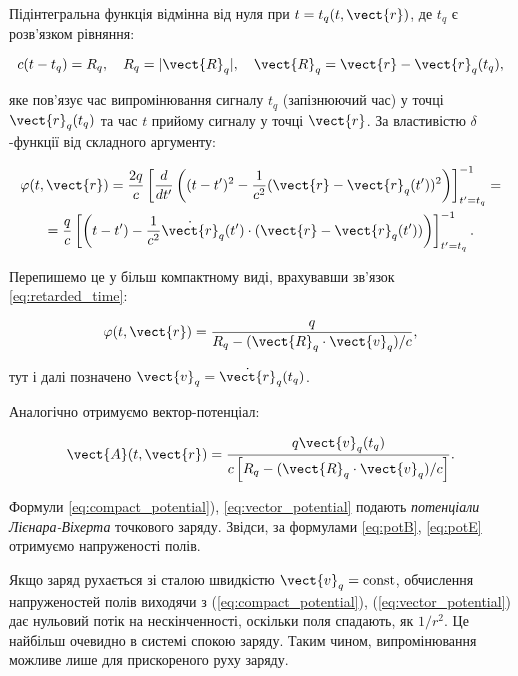 Підінтегральна функція відмінна від нуля при \( t = t_q (t, \vect{r}) \), де \( t_q \) є розв’язком рівняння:

\begin{equation}\label{eq:retarded_time}
	c(t - t_q) = R_q, \quad R_q = |\vect{R}_q|, \quad \vect{R}_q = \vect{r} - \vect{r}_q (t_q),
\end{equation}

яке пов'язує час випромінювання сигналу \( t_q \) (запізнюючий час) у точці \( \vect{r}_q (t_q) \) та час \( t \) прийому сигналу у точці \( \vect{r}
\). За властивістю \(\delta\)-функції від складного аргументу:

\begin{multline}\label{eq:4.1.4}
	\varphi(t, \vect{r}) = \frac{2q}{c} \left[ \frac{d}{dt'} \left( (t - t')^2 - \frac{1}{c^2} (\vect{r} - \vect{r}_q (t'))^2 \right) \right]_{t' =
	t_q}^{-1} = \\
    = \frac{q}{c} \left[ \left( t - t') - \frac{1}{c^2} \dot{\vect{r}}_q (t') \cdot (\vect{r} - \vect{r}_q (t')) \right) \right]_{t' = t_q}^{-1}.
\end{multline}

Перепишемо це у більш компактному виді, врахувавши зв'язок \eqref{eq:retarded_time}:

\begin{equation}
	\varphi(t, \vect{r}) = \frac{q}{R_q - (\vect{R}_q \cdot \vect{v}_q)/c},
	\label{eq:compact_potential}
\end{equation}

тут і далі позначено \( \vect{v}_q = \dot{\vect{r}}_q (t_q) \).

Аналогічно отримуємо вектор-потенціал:

\begin{equation}
	\vect{A}(t, \vect{r}) = \frac{q \vect{v}_q (t_q)}{c \left[ R_q - (\vect{R}_q \cdot \vect{v}_q)/c \right]}.
	\label{eq:vector_potential}
\end{equation}

Формули \eqref{eq:compact_potential}), \eqref{eq:vector_potential} подають \textit{потенціали Лієнара-Віхерта} точкового заряду. Звідси, за формулами
\eqref{eq:potB}, \eqref{eq:potE} отримуємо напруженості полів.

Якщо заряд рухається зі сталою швидкістю \( \vect{v}_q = \text{const} \), обчислення напруженостей полів виходячи з (\ref{eq:compact_potential}),
(\ref{eq:vector_potential}) дає нульовий потік на нескінченності, оскільки поля спадають, як \( 1/r^2 \). Це найбільш очевидно в системі спокою заряду.
Таким чином, випромінювання можливе лише для прискореного руху заряду.

